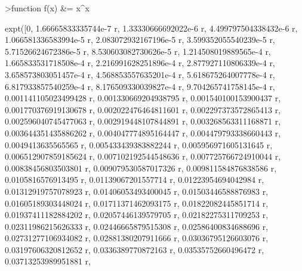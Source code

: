 \documentclass[a4paper,10pt]{article}
\begin{document}
\begin{eulernotebook}
\begin{eulercomment}
\begin{eulercomment}
\begin{eulercomment}
\begin{eulercomment}
\begin{eulercomment}
\begin{eulercomment}
\begin{eulercomment}
\begin{eulercomment}
\begin{eulercomment}
\begin{eulercomment}
\begin{eulercomment}
\begin{eulercomment}
\begin{eulercomment}
\begin{eulercomment}
\begin{eulercomment}
\begin{eulercomment}
\begin{eulercomment}
\begin{eulercomment}
\begin{eulercomment}
\begin{eulercomment}
\begin{eulercomment}
\begin{eulercomment}
\begin{eulercomment}
\begin{eulercomment}
\begin{eulercomment}
\begin{eulercomment}
\begin{eulercomment}
\begin{eulercomment}
\begin{eulerprompt}
>function f(x) &= x^x
\end{eulerprompt}
\begin{euleroutput}
  
          expt([0, 1.66665833335744e-7 r, 1.33330666692022e-6 r, 
  4.499797504338432e-6 r, 1.066581336583994e-5 r, 
  2.083072932167196e-5 r, 3.599352055540239e-5 r, 
  5.71526624672386e-5 r, 8.530603082730626e-5 r, 
  1.214508019889565e-4 r, 1.665833531718508e-4 r, 
  2.216991628251896e-4 r, 2.877927110806339e-4 r, 
  3.658573803051457e-4 r, 4.568853557635201e-4 r, 
  5.618675264007778e-4 r, 6.817933857540259e-4 r, 
  8.176509330039827e-4 r, 9.704265741758145e-4 r, 
  0.001141105023499428 r, 0.001330669204938795 r, 
  0.001540100153900437 r, 0.001770376919130678 r, 
  0.002022476464811601 r, 0.002297373572865413 r, 
  0.002596040745477063 r, 0.002919448107844891 r, 
  0.003268563311168871 r, 0.003644351435886262 r, 
  0.004047774895164447 r, 0.004479793338660443 r, 0.0049413635565565 r, 
  0.005433439383882244 r, 0.005956971605131645 r, 
  0.006512907859185624 r, 0.007102192544548636 r, 
  0.007725766724910044 r, 0.00838456803503801 r, 
  0.009079530587017326 r, 0.009811584876838586 r, 0.0105816576913495 r, 
  0.01139067201557714 r, 0.01223954694042984 r, 0.01312919757078923 r, 
  0.01406053493400045 r, 0.01503446588876983 r, 0.01605189303448024 r, 
  0.01711371462093175 r, 0.01822082445851714 r, 0.01937411182884202 r, 
  0.02057446139579705 r, 0.02182275311709253 r, 0.02311986215626333 r, 
  0.02446665879515308 r, 0.02586400834688696 r, 0.02731277106934082 r, 
  0.02881380207911666 r, 0.03036795126603076 r, 0.03197606320812652 r, 
  0.0336389770872163 r, 0.03535752660496472 r, 0.03713253989951881 r, 

\end{euleroutput}
\end{eulercomment}
\end{eulercomment}
\end{eulercomment}
\end{eulercomment}
\end{eulercomment}
\end{eulercomment}
\end{eulercomment}
\end{eulercomment}
\end{eulercomment}
\end{eulercomment}
\end{eulercomment}
\end{eulercomment}
\end{eulercomment}
\end{eulercomment}
\end{eulercomment}
\end{eulercomment}
\end{eulercomment}
\end{eulercomment}
\end{eulercomment}
\end{eulercomment}
\end{eulercomment}
\end{eulercomment}
\end{eulercomment}
\end{eulercomment}
\end{eulercomment}
\end{eulercomment}
\end{eulercomment}
\end{eulercomment}
\end{eulernotebook}
\end{document}
